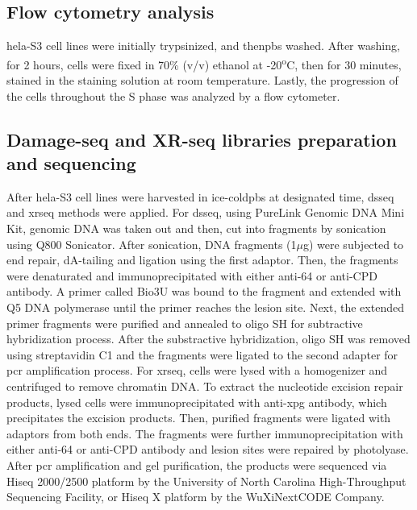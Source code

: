 \subsection{Flow cytometry analysis}
\gls{hela}-S3 cell lines were initially trypsinized, and then\gls{pbs} washed. After washing, for 2 hours, cells were fixed in 70\% (v/v) ethanol at -20\textsuperscript{o}C, then for 30 minutes, stained in the staining solution at room temperature. Lastly, the progression of the cells throughout the S phase was analyzed by a flow cytometer.

\subsection{Damage-seq and  XR-seq libraries preparation and sequencing}
After \gls{hela}-S3 cell lines were harvested in ice-cold\gls{pbs} at designated time, \gls{dsseq} and \gls{xrseq} methods were applied. For \gls{dsseq}, using PureLink Genomic DNA Mini Kit, genomic DNA was taken out and then, cut into fragments by sonication using Q800 Sonicator. After sonication, DNA fragments (1$\mu$g) were subjected to end repair, dA-tailing and ligation using the first adaptor. Then, the fragments were denaturated and immunoprecipitated with either anti-\gls{64} or anti-\gls{CPD} antibody. A primer called Bio3U was bound to the fragment and extended with Q5 DNA polymerase until the primer reaches the lesion site. Next, the extended primer fragments were purified and annealed to oligo SH for subtractive hybridization process. After the substractive hybridization, oligo SH was removed using streptavidin C1 and the fragments were ligated to the second adapter for \gls{pcr} amplification process. For \gls{xrseq}, cells were lysed with a homogenizer and centrifuged to remove chromatin DNA. To extract the nucleotide excision repair products, lysed cells were immunoprecipitated with anti-\gls{xpg} antibody, which precipitates the excision products. Then, purified fragments were ligated with adaptors from both ends. The fragments were further immunoprecipitation with either anti-\gls{64} or anti-\gls{CPD} antibody and lesion sites were repaired by photolyase. After \gls{pcr} amplification and gel purification, the products were sequenced via Hiseq 2000/2500 platform by the University of North Carolina High-Throughput Sequencing Facility, or Hiseq X platform by the WuXiNextCODE Company.  

